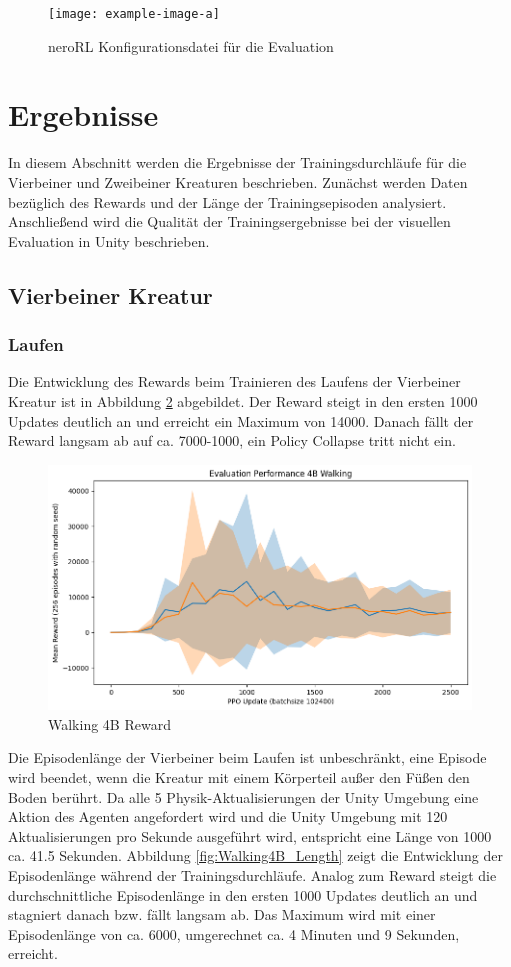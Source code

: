\begin{figure}[ht]
    \centering
    \texttt{[image: example-image-a]}
    \caption{neroRL Konfigurationsdatei für die Evaluation}\label{fig:evaluation_config}
\end{figure}


\section{Ergebnisse}
In diesem Abschnitt werden die Ergebnisse der Trainingsdurchläufe für die Vierbeiner und Zweibeiner Kreaturen beschrieben. Zunächst werden Daten bezüglich des Rewards und der Länge der Trainingsepisoden analysiert. Anschließend wird die Qualität der Trainingsergebnisse bei der visuellen Evaluation in Unity beschrieben.

\subsection{Vierbeiner Kreatur}

\subsubsection{Laufen}
Die Entwicklung des Rewards beim Trainieren des Laufens der Vierbeiner Kreatur ist in Abbildung \ref{fig:Walking4B_Reward} abgebildet. Der Reward steigt in den ersten 1000 Updates deutlich an und erreicht ein Maximum von 14000. Danach fällt der Reward langsam ab auf ca. 7000-1000, ein Policy Collapse tritt nicht ein. 

\begin{figure}[ht]
    \centering
    \includegraphics[width=0.5\linewidth]{resources/img/results/Walking4B_Reward.png}
    \caption{Walking 4B Reward}\label{fig:Walking4B_Reward}
\end{figure}

Die Episodenlänge der Vierbeiner beim Laufen ist unbeschränkt, eine Episode wird beendet, wenn die Kreatur mit einem Körperteil außer den Füßen den Boden berührt. Da alle 5 Physik-Aktualisierungen der Unity Umgebung eine Aktion des Agenten angefordert wird und die Unity Umgebung mit 120 Aktualisierungen pro Sekunde ausgeführt wird, entspricht eine Länge von 1000 ca. 41.5 Sekunden. Abbildung \ref{fig:Walking4B_Length} zeigt die Entwicklung der Episodenlänge während der Trainingsdurchläufe. Analog zum Reward steigt die durchschnittliche Episodenlänge in den ersten 1000 Updates deutlich an und stagniert danach bzw. fällt langsam ab. Das Maximum wird mit einer Episodenlänge von ca. 6000, umgerechnet ca. 4 Minuten und 9 Sekunden, erreicht.

